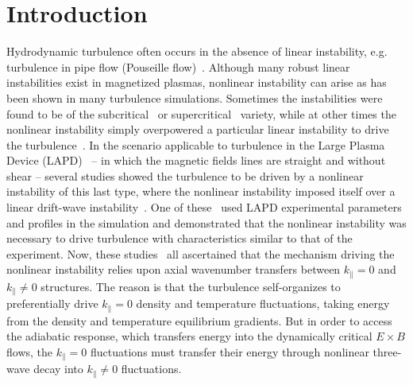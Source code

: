 \documentclass[showpacs,preprintnumbers,amsmath,amssymb,superscriptaddress,aip]{revtex4-1}
\def\para{\parallel}
\begin{document}
\section{Introduction}

Hydrodynamic turbulence often occurs in the absence of linear instability, e.g. turbulence in pipe flow (Pouseille flow)~\cite{}.  Although many robust linear instabilities exist in magnetized plasmas, nonlinear instability can arise as has been shown in many turbulence simulations.
Sometimes the instabilities were found to be of the subcritical~\cite{waltz1985,scott1990,scott1992,nordman1993,itoh1996,highcock2012} or supercritical~\cite{dimits2000,ernst2004} variety, 
while at other times the nonlinear instability simply overpowered a particular linear instability to drive the 
turbulence~\cite{biskamp1995,drake1995,zeiler1996,zeiler1997,korsholm1999,scott2002,scott2003,scott2005,friedman2012b}. In the scenario applicable to turbulence in
the Large Plasma Device (LAPD)~\cite{Gekelman1991} -- in which the magnetic fields lines are straight and without shear -- several studies showed the turbulence to be driven by a nonlinear instability
of this last type, where the nonlinear instability imposed itself over a linear drift-wave instability~\cite{biskamp1995,drake1995,korsholm1999,friedman2012b}. 
One of these~\cite{friedman2012b} used LAPD experimental parameters and profiles in the simulation and demonstrated
that the nonlinear instability was necessary to drive turbulence with characteristics similar to that of the experiment.
Now, these studies~\cite{biskamp1995,drake1995,korsholm1999,friedman2012b} all ascertained
that the mechanism driving the nonlinear instability relies upon axial wavenumber transfers between $k_\para = 0$ and $k_\para \ne 0$ structures. The reason is that the turbulence self-organizes
to preferentially drive $k_\para = 0$ density and temperature fluctuations, taking energy from the density and temperature equilibrium gradients. But in order to access the adiabatic response,
which transfers energy into the dynamically critical $E \times B$ flows, the $k_\para = 0$ fluctuations must transfer their energy through nonlinear three-wave decay into $k_\para \ne 0$ fluctuations.
\end{document}
